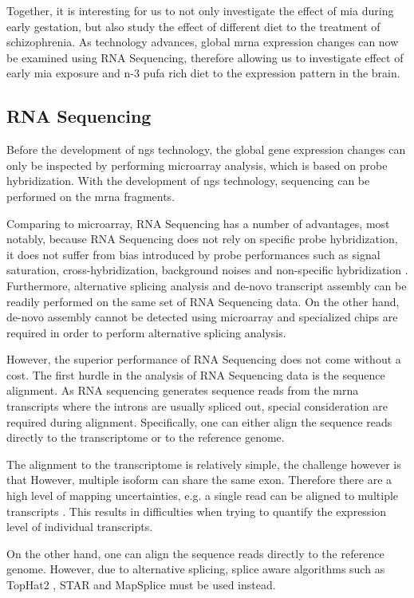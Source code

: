 \documentclass[12pt]{scrbook}
\newcommand*{\scz}{schizophrenia}
\begin{document}
Together, it is interesting for us to not only investigate the effect of \gls{mia} during early gestation, but also study the effect of different diet to the treatment of \scz.
As technology advances, global \gls{mrna} expression changes can now be examined using RNA Sequencing, therefore allowing us to investigate effect of early \gls{mia} exposure and n-3 \gls{pufa} rich diet to the expression pattern in the brain.

\subsection{RNA Sequencing}
Before the development of \gls{ngs} technology, the global gene expression changes can only be inspected by performing microarray analysis, which is based on probe hybridization.
With the development of \gls{ngs} technology, sequencing can be performed on the \gls{mrna} fragments.

Comparing to microarray, RNA Sequencing has a number of advantages, most notably, because RNA Sequencing does not rely on specific probe hybridization, it does not suffer from bias introduced by probe performances such as signal saturation, cross-hybridization, background noises and non-specific hybridization \citep{Zhao2014}.
Furthermore, alternative splicing analysis and de-novo transcript assembly can be readily performed on the same set of RNA Sequencing data.
On the other hand, de-novo assembly cannot be detected using microarray and specialized chips are required in order to perform alternative splicing analysis. 

However, the superior performance of RNA Sequencing does not come without a cost.
The first hurdle in the analysis of RNA Sequencing data is the sequence alignment.
As RNA sequencing generates sequence reads from the \gls{mrna} transcripts where the introns are usually spliced out, special consideration are required during alignment.
Specifically, one can either align the sequence reads directly to the transcriptome or to the reference genome.

The alignment to the transcriptome is relatively simple, the challenge however is that However, multiple isoform can share the same exon. 
Therefore there are a high level of mapping uncertainties, e.g. a single read can be aligned to multiple transcripts \citep{Li2011e}.
This results in difficulties when trying to quantify the expression level of individual transcripts. 

On the other hand, one can align the sequence reads directly to the reference genome. 
However, due to alternative splicing, splice aware algorithms such as  TopHat2 \citep{Kim2013}, STAR \citep{Dobin2013} and MapSplice \citep{Wang2010} must be used instead. 
\end{document}
